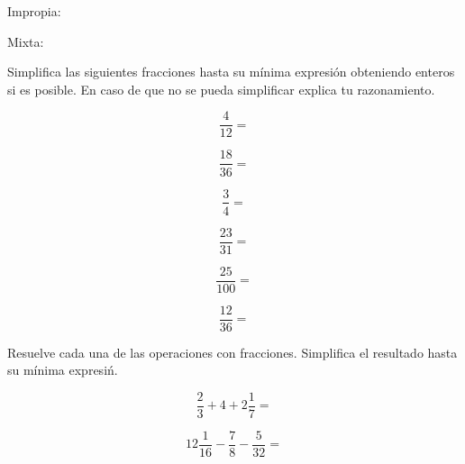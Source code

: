 \documentclass[11pt]{article}
\begin{document}
Impropia:

\vspace{1.5cm}

Mixta:

\vspace{1.5cm}


Simplifica las siguientes fracciones hasta su m\'inima expresi\'on obteniendo
enteros si es posible. En caso de que no se pueda simplificar explica tu
razonamiento.

\begin{multicols}{2}

\begin{equation}    \frac{4}{12}=   \nonumber\end{equation}

\begin{equation}    \frac{18}{36}=  \nonumber\end{equation}

\begin{equation}    \frac{3}{4}=    \nonumber\end{equation}

\begin{equation}    \frac{23}{31}=  \nonumber\end{equation}

\begin{equation}    \frac{25}{100}= \nonumber\end{equation}

\begin{equation}    \frac{12}{36}=  \nonumber\end{equation}

\end{multicols}

\vspace{1cm}

Resuelve cada una de las operaciones con fracciones. Simplifica el resultado
hasta su m\'inima expresi\'n.
    

\begin{equation}
    \frac{2}{3} + 4 + 2 \frac{1}{7}= \nonumber
\end{equation}

\vspace{2.5cm}

\begin{equation}
    12\frac{1}{16} - \frac{7}{8} - \frac{5}{32}  = \nonumber
\end{equation}

\vspace{2.5cm}
\end{document}

